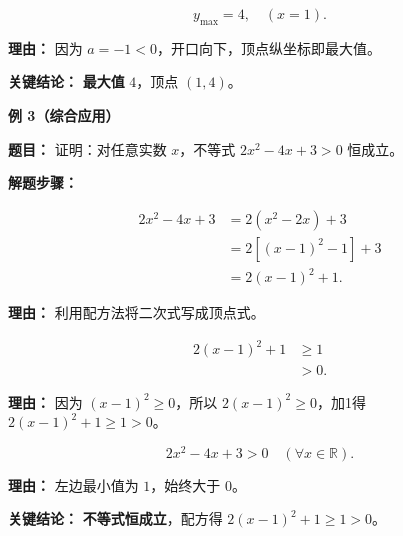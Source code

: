 \begin{examplebox}
\begin{description}[style=nextline, leftmargin=2.8em, labelsep=0.5em, itemsep=0.45em]
		\item[\textbf{第三步（读出最值）：}]
			\[
				y_{\max}=4,\quad (x=1).
			\]
			\par\textbf{理由：} 因为 $a=-1<0$，开口向下，顶点纵坐标即最大值。
	\end{description}

	\textbf{\textcolor{CExample}{关键结论：}}
	\textbf{最大值} $4$，顶点 $(1,4)$。

	\medskip
	\textbf{\textcolor{CExample}{例 3（综合应用）}}

	\textbf{\textcolor{CExample}{题目：}}
	证明：对任意实数 $x$，不等式 $2x^2-4x+3>0$ 恒成立。

	\textbf{\textcolor{CExample}{解题步骤：}}
	\begin{description}[style=nextline, leftmargin=2.8em, labelsep=0.5em, itemsep=0.45em]
		\item[\textbf{第一步（配方化简）：}]
			\[
				\begin{aligned}
					2x^2-4x+3 &= 2(x^2-2x)+3 \\
					&= 2[(x-1)^2-1]+3 \\
					&= 2(x-1)^2+1.
			\end{aligned}
			\]
			\par\textbf{理由：} 利用配方法将二次式写成顶点式。

		\item[\textbf{第二步（平方非负）：}]
			\[
				\begin{aligned}
					2(x-1)^2+1 &\ge 1 \\
					&> 0.
			\end{aligned}
			\]
			\par\textbf{理由：} 因为 $(x-1)^2\ge 0$，所以 $2(x-1)^2\ge 0$，加1得 $2(x-1)^2+1\ge 1>0$。

		\item[\textbf{第三步（得出结论）：}]
			\[
				2x^2-4x+3 > 0 \quad (\forall x\in\mathbb{R}).
			\]
			\par\textbf{理由：} 左边最小值为 $1$，始终大于 $0$。
	\end{description}

	\textbf{\textcolor{CExample}{关键结论：}}
	\textbf{不等式恒成立}，配方得 $2(x-1)^2+1\ge1>0$。
\end{examplebox}
